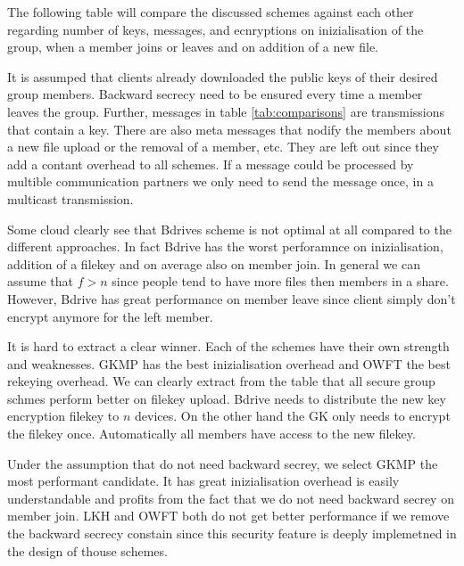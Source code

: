 The following table will compare the discussed schemes against each other regarding number of keys, messages, and ecnryptions on inizialisation of the group, when a member joins or leaves and on addition of a new file. 

It is assumped that clients already downloaded the public keys of their desired group members. Backward secrecy need to be ensured every time a member leaves the group.
Further, messages in table \ref{tab:comparisons} are transmissions that contain a key. There are also meta messages that nodify the members about a new file upload or the removal of a member, etc. They are left out since they add a contant overhead to all schemes.  If a message could be processed by multible communication partners we only need to send the message once, in a multicast transmission.

Some cloud clearly see that Bdrives scheme is not optimal at all compared to the different approaches. In fact Bdrive has the worst perforamnce on inizialisation, addition of a filekey and on average also on member join. In general we can assume that $f > n$ since people tend to have more files then members in a share. However, Bdrive has great performance on member leave since client simply don't encrypt anymore for the left member.

It is hard to extract a clear winner. Each of the schemes have their own strength and weaknesses. GKMP has the best inizialisation overhead and OWFT the best rekeying overhead. We can clearly extract from the table that all secure group schmes perform better on filekey upload. Bdrive needs to distribute the new key encryption filekey to $n$ devices. On the other hand the GK only needs to encrypt the filekey once. Automatically all members have access to the new filekey. 

Under the assumption that do not need backward secrey, we select GKMP the most performant candidate. It has great inizialisation overhead is easily understandable and profits from the fact that we do not need backward secrey on member join. LKH and OWFT both do not get better performance if we remove the backward secrecy constain since this security feature is deeply implemetned in the design of thouse schemes. 